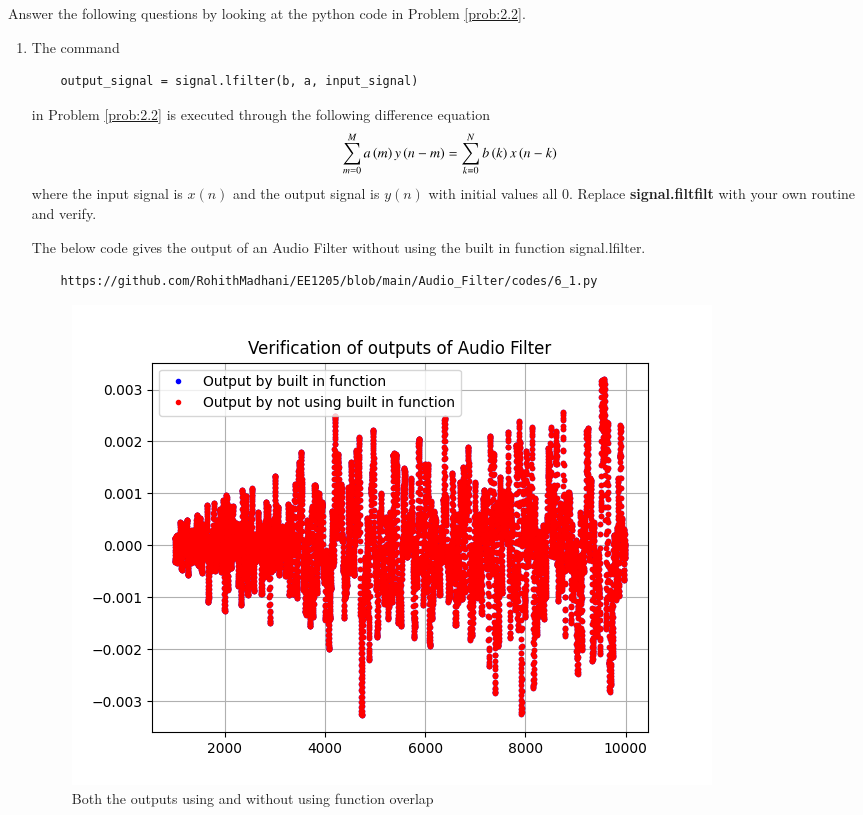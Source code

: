 \documentclass[journal,12pt,twocolumn]{IEEEtran}
\theoremstyle{remark}
\begin{document}
Answer the following questions by looking at the python code in Problem \ref{prob:2.2}.
\begin{enumerate}[label=\thesection.\arabic*]
\item
The command
\begin{lstlisting}
	output_signal = signal.lfilter(b, a, input_signal)
	\end{lstlisting}
in Problem \ref{prob:2.2} is executed through the following difference equation
\begin{equation}
\label{eq:iir_filter_gen}
 \sum _{m=0}^{M}a\left(m\right)y\left(n-m\right)=\sum _{k=0}^{N}b\left(k\right)x\left(n-k\right)
\end{equation}
%
where the input signal is $x(n)$ and the output signal is $y(n)$ with initial values all 0. Replace
\textbf{signal.filtfilt} with your own routine and verify.

\solution The below code gives the output of an Audio Filter without using the built in function signal.lfilter.
\begin{lstlisting}
    https://github.com/RohithMadhani/EE1205/blob/main/Audio_Filter/codes/6_1.py
\end{lstlisting}

\begin{figure}[H]
\centering
\includegraphics[width=\columnwidth]{figs/6_1.png}
\caption{Both the outputs using and without using function overlap}
\label{fig:6.1_plot}
\end{figure}






\end{enumerate}
\end{document}
